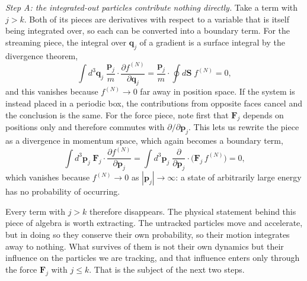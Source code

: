 \documentclass[12pt]{article}
\renewcommand{\vec}[1]{\bm{#1}}
\begin{document}
\emph{Step A: the integrated-out particles contribute nothing
directly.}  Take a term with $j>k$.  Both of its pieces are derivatives
with respect to a variable that is itself being integrated over, so
each can be converted into a boundary term.  For the streaming piece,
the integral over $\vec q_j$ of a gradient is a surface integral by the
divergence theorem,
%
\begin{equation}
  \int\! d^3\vec q_j\;\frac{\vec p_j}{m}\!\cdot\!\frac{\partial f^{(N)}}{\partial\vec q_j}
   = \frac{\vec p_j}{m}\!\cdot\!\oint\! d\vec S\; f^{(N)} = 0,
\end{equation}
%
and this vanishes because $f^{(N)}\to 0$ far away in position space.
If the system is instead placed in a periodic box, the contributions
from opposite faces cancel and the conclusion is the same.  For the
force piece, note first that $\vec F_j$ depends on positions only and
therefore commutes with $\partial/\partial\vec p_j$.  This lets us
rewrite the piece as a divergence in momentum space, which again
becomes a boundary term,
%
\begin{equation}
  \int\! d^3\vec p_j\;\vec F_j\!\cdot\!\frac{\partial f^{(N)}}{\partial\vec p_j}
   = \int\! d^3\vec p_j\;\frac{\partial}{\partial\vec p_j}\!\cdot\!
     \bigl(\vec F_j\, f^{(N)}\bigr) = 0,
\end{equation}
%
which vanishes because $f^{(N)}\to 0$ as $|\vec p_j|\to\infty$: a state
of arbitrarily large energy has no probability of occurring.

Every term with $j>k$ therefore disappears.  The physical statement
behind this piece of algebra is worth extracting.  The untracked
particles move and accelerate, but in doing so they conserve their own
probability, so their motion integrates away to nothing.  What survives
of them is not their own dynamics but their influence on the particles
we are tracking, and that influence enters only through the force
$\vec F_j$ with $j\le k$.  That is the subject of the next two steps.
\end{document}
